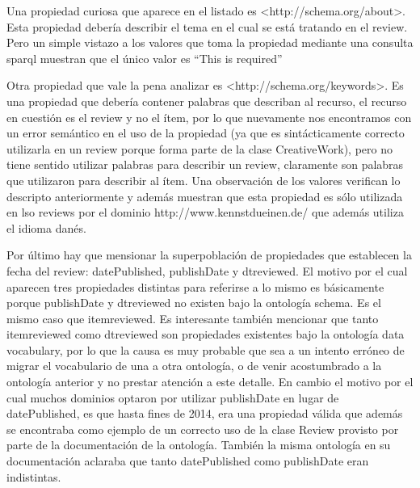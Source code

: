  Una propiedad curiosa que aparece en el listado es <http://schema.org/about>. Esta propiedad debería describir el tema en el cual 
 se está tratando en el review. Pero un simple vistazo a los valores que toma la propiedad mediante una consulta sparql muestran que 
 el único valor es ``This is required''
 
 Otra propiedad que vale la pena analizar es <http://schema.org/keywords>. Es una propiedad que debería contener palabras que describan al recurso, 
 el recurso en cuestión es el review y no el ítem, por lo que nuevamente nos encontramos con un error semántico en el uso de la propiedad (ya que es sintácticamente 
 correcto utilizarla en un review porque forma parte de la clase CreativeWork), pero no tiene sentido utilizar palabras para describir un review, claramente 
 son palabras que utilizaron para describir al ítem.
 Una observación de los valores verifican lo descripto anteriormente y además muestran que esta propiedad es sólo utilizada en lso reviews por el dominio 
 http://www.kennstdueinen.de/ que además utiliza el idioma danés.
 
 Por último hay que mensionar la superpoblación de propiedades que establecen la fecha del review: datePublished, publishDate y dtreviewed.
 El motivo por el cual aparecen tres propiedades distintas para referirse a lo mismo es básicamente porque publishDate y dtreviewed no existen bajo la 
 ontología schema. Es el mismo caso que itemreviewed. 
 Es interesante también mencionar que tanto itemreviewed como dtreviewed son propiedades existentes bajo la ontología data vocabulary, 
 por lo que la causa es muy probable que sea a un intento erróneo de migrar el vocabulario de una a otra ontología, o de venir acostumbrado a la 
 ontología anterior y no prestar atención a este detalle.
 En cambio el motivo por el cual muchos dominios optaron por utilizar publishDate en lugar de datePublished, es que hasta fines de 2014, 
 era una propiedad válida que además se encontraba como ejemplo de un correcto uso de la clase Review provisto por parte de la documentación 
 de la ontología. 
 También la misma ontología en su documentación aclaraba que tanto datePublished como publishDate eran indistintas.
 

